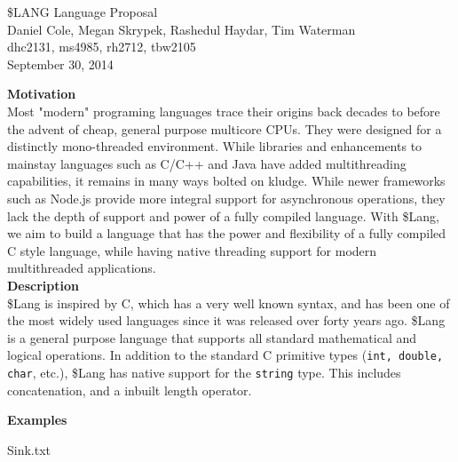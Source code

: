 \documentclass[11pt, oneside]{article}   	%
\date{}							%
\begin{document}
\begin{center}
\LARGE
\$LANG Language Proposal\\[2em]
\Large 
Daniel Cole, Megan Skrypek, Rashedul Haydar, Tim Waterman\\
\large dhc2131, ms4985, rh2712, tbw2105\\[2em]
\normalsize
September 30, 2014\\[3em]
\end{center}

\LARGE\textbf{Motivation}\\[.5em]
\normalsize
Most "modern" programing languages trace their origins back decades to before the advent of cheap, general purpose multicore CPUs.  They were designed for a distinctly mono-threaded environment.  While libraries and enhancements to mainstay languages such as C/C++ and Java have added multithreading capabilities, it remains in many ways bolted on kludge.  While newer frameworks such as Node.js provide more integral support for asynchronous operations, they lack the depth of support and power of a fully compiled language.  With \$Lang, we aim to build a language that has the power and flexibility of a fully compiled C style language, while having native threading support for modern multithreaded applications.
\\[3em]
\LARGE\textbf{Description}\\[.5em]
\normalsize
\$Lang is inspired by C, which has a very well known syntax, and has been one of the most widely used languages since it was released over forty years ago.  \$Lang is a general purpose language that supports all standard mathematical and logical operations.  In addition to the standard C primitive types (\verb|int, double, char|, etc.), \$Lang has native support for the \verb|string| type.  This includes concatenation, and a inbuilt length operator. 

\newpage

\LARGE\textbf{Examples}\\[.5em]
\normalsize

{Sink.txt}
\end{document}
